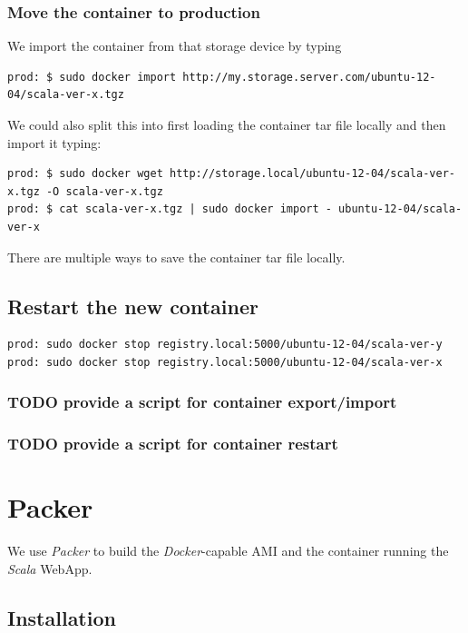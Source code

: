 \documentclass[captions=tableheading]{article}
\begin{document}
\subsubsection{Move the container to production}
\label{sec-6-3-2}

We import the container from that storage device by typing 

\begin{verbatim}
prod: $ sudo docker import http://my.storage.server.com/ubuntu-12-04/scala-ver-x.tgz
\end{verbatim}
We could also split this into first loading the container tar file locally and then import it typing:

\begin{verbatim}
prod: $ sudo docker wget http://storage.local/ubuntu-12-04/scala-ver-x.tgz -O scala-ver-x.tgz
prod: $ cat scala-ver-x.tgz | sudo docker import - ubuntu-12-04/scala-ver-x
\end{verbatim}
There are multiple ways to save the container tar file locally.
\subsection{Restart the new container}
\label{sec-6-4}


\begin{verbatim}
prod: sudo docker stop registry.local:5000/ubuntu-12-04/scala-ver-y
prod: sudo docker stop registry.local:5000/ubuntu-12-04/scala-ver-x
\end{verbatim}
\subsubsection{\textbf{TODO} provide a script for container export/import}
\label{sec-6-4-1}
\subsubsection{\textbf{TODO} provide a script for container restart}
\label{sec-6-4-2}
\section{Packer}
\label{sec-7}

We use \emph{Packer} to build the \emph{Docker}-capable AMI and the container running the \emph{Scala} WebApp.
\subsection{Installation}
\label{sec-7-1}
\end{document}
